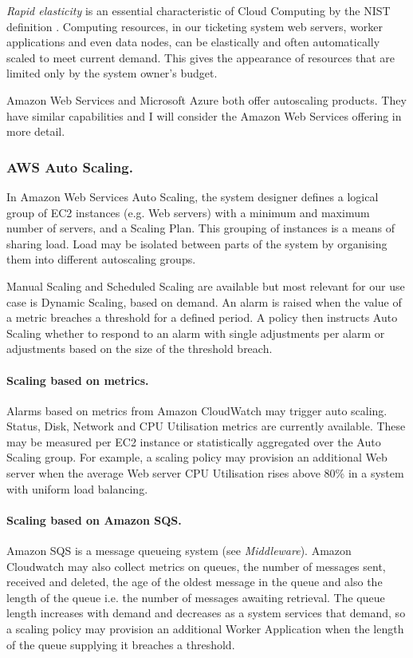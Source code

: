 {\itshape Rapid elasticity} is an essential characteristic of Cloud Computing by the NIST definition \cite{mell2011nist}.  Computing resources, in our ticketing system web servers, worker applications and even data nodes, can be elastically and often automatically scaled to meet current demand.  This gives the appearance of resources that are limited only by the system owner's budget.

Amazon Web Services \cite{awsautoscaling} and Microsoft Azure \cite{azurescalesets} both offer autoscaling products.  They have similar capabilities and I will consider the Amazon Web Services offering in more detail.

\subsubsection{AWS Auto Scaling.} In Amazon Web Services Auto Scaling, the system designer defines a logical group of EC2 instances (e.g. Web servers) with a minimum and maximum number of servers, and a Scaling Plan.  This grouping of instances is a means of sharing load.  Load may be isolated between parts of the system by organising them into different autoscaling groups.

Manual Scaling and Scheduled Scaling are available but most relevant for our use case is Dynamic Scaling, based on demand.  An alarm is raised when the value of a metric breaches a threshold for a defined period.  A policy then instructs Auto Scaling whether to respond to an alarm with single adjustments per alarm or adjustments based on the size of the threshold breach.

\paragraph{Scaling based on metrics.} Alarms based on metrics from Amazon CloudWatch may trigger auto scaling.  Status, Disk, Network and CPU Utilisation metrics are currently available. These may be measured per EC2 instance or statistically aggregated over the Auto Scaling group.  For example, a scaling policy may provision an additional Web server when the average Web server CPU Utilisation rises above 80\% in a system with uniform load balancing.

\paragraph{Scaling based on Amazon SQS.} Amazon SQS is a message queueing system (see {\itshape Middleware}).  Amazon Cloudwatch may also collect metrics on queues, the number of messages sent, received and deleted, the age of the oldest message in the queue and also the length of the queue i.e. the number of messages awaiting retrieval.  The queue length increases with demand and decreases as a system services that demand, so a scaling policy may provision an additional Worker Application when the length of the queue supplying it breaches a threshold.

